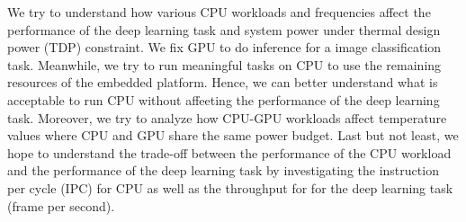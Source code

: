 We try to understand how various CPU workloads and frequencies affect the performance of the deep learning task and system power under thermal design power (TDP) constraint. We fix GPU to do inference for a image classification task. Meanwhile, we try to run meaningful tasks on CPU to use the remaining resources of the embedded platform. Hence, we can better understand what is acceptable to run CPU without affeeting the performance of the deep learning task. Moreover, we try to analyze how CPU-GPU workloads affect temperature values where CPU and GPU share the same power budget. Last but not least, we hope to understand the trade-off between the performance of the CPU workload and the performance of the deep learning task by investigating the instruction per cycle (IPC) for CPU as well as the throughput for for the deep learning task (frame per second).